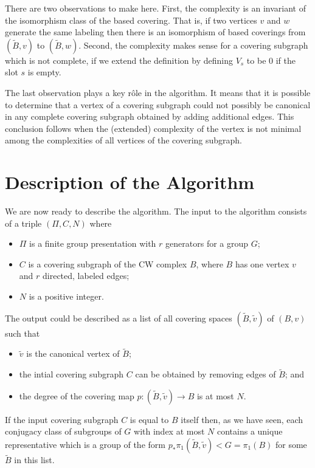 \documentclass[12pt]{article}
\theoremstyle{definition}
\renewcommand{\tilde}{\widetilde}
\begin{document}
   There are two observations to make here.  First, the complexity is an
   invariant of the isomorphism class of the based covering.  That is, if two
   vertices $v$ and $w$ generate the same labeling then there is an isomorphism
   of based coverings from $(\tilde B, v)$ to $(\tilde B, w)$.  Second, the
   complexity makes sense for a covering subgraph which is not complete,
   if we extend the definition by defining $V_s$ to be $0$ if the slot $s$ is empty.

   The last observation plays a key r\^ole in the algorithm.  It means that it
   is possible to determine that a vertex of a covering subgraph could not
   possibly be canonical in any complete covering subgraph obtained by adding
   additional edges.  This conclusion follows when the (extended) complexity of
   the vertex is not minimal among the complexities of all vertices of the
   covering subgraph.
   
   \section{Description of the Algorithm}

   We are now ready to describe the algorithm.  The input to the algorithm
   consists of a triple $(\Pi, C, N)$ where
   \begin{itemize}
   \item $\Pi$ is a finite group presentation with $r$ generators for a group $G$;
   \item $C$ is a covering subgraph of the CW complex $B$, where $B$ has
     one vertex $v$ and $r$ directed, labeled edges;
   \item $N$ is a positive integer.
   \end{itemize}
     
   The output could be described as a list of all covering spaces
   $(\tilde B, \tilde v)$ of $(B,v)$ such that
   \begin{itemize}
     \item $\tilde v$ is the canonical vertex of $\tilde B$;
     \item the intial covering subgraph $C$ can be obtained by removing edges
       of $\tilde B$; and
     \item the degree of the covering map $p: (\tilde B, \tilde v)\to B$ is at
       most $N$.
     \end{itemize}

     If the input covering subgraph $C$ is equal to $B$ itself then, as we
     have seen, each conjugacy class of subgroups of $G$ with index at most $N$
     contains a unique representative which is a group of the form
     $p_*\pi_1(\tilde B, \tilde v) < G =\pi_1(B)$ for some $\tilde B$ in this
     list.
\end{document}
